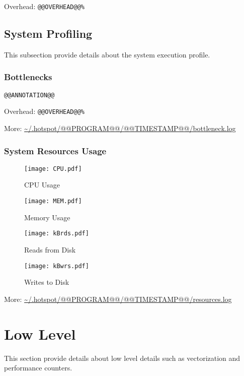 \documentclass[a4paper]{article}
\begin{document}
Overhead: {\tt @@OVERHEAD@@\%}

\subsection{System Profiling}

This subsection provide details about the system execution profile.

\subsubsection{Bottlenecks}

\begin{verbatim}
@@ANNOTATION@@
\end{verbatim}

Overhead: {\tt @@OVERHEAD@@\%}

More: \url{~/.hotspot/@@PROGRAM@@/@@TIMESTAMP@@/bottleneck.log}

\subsubsection{System Resources Usage}

\begin{figure}[H]
\label{fig:cpu}
\centering
\texttt{[image: CPU.pdf]}
\caption{CPU Usage}
\end{figure}

\begin{figure}[H]
\label{fig:memory}
\centering
\texttt{[image: MEM.pdf]}
\caption{Memory Usage}
\end{figure}

\begin{figure}[H]
\label{fig:reads}
\centering
\texttt{[image: kBrds.pdf]}
\caption{Reads from Disk}
\end{figure}

\begin{figure}[H]
\label{fig:writes}
\centering
\texttt{[image: kBwrs.pdf]}
\caption{Writes to Disk}
\end{figure}

More: \url{~/.hotspot/@@PROGRAM@@/@@TIMESTAMP@@/resources.log}

\section{Low Level}

This section provide details about low level details such as vectorization and performance counters.
\end{document}
